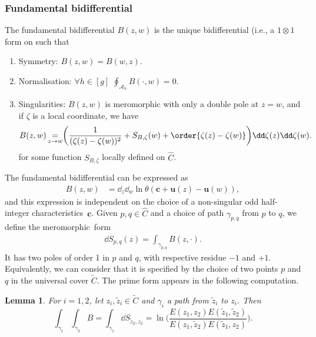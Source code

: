 \documentclass[10pt,a4paper]{amsart}
\numberwithin{equation}{section}
\newtheorem{Lemma}[Theorem]{Lemma}
\newcommand{\A}{\mathcal{A}}
\begin{document}
\subsubsection{Fundamental bidifferential}
\begin{Definition}
 The fundamental bidifferential $B(z, w)$ is the unique bidifferential \big(i.e., a $1 \otimes 1$ form on  such that
 \begin{enumerate}\itemsep=0pt
 \item Symmetry: $B(z, w) = B(w, z)$.
 \item Normalisation: $\forall h \in [g]$ $\oint_{\A_{h}}B(\cdot, w) = 0$.
 \item Singularities: $B(z, w)$ is meromorphic with only a double pole at $z = w$, and if $\zeta$ is a local coordinate, we have
\[
 B(z, w) \mathop{=}_{z \rightarrow w} \biggl(\frac{1}{(\zeta(z) - \zeta(w))^{2}} + S_{B,\zeta}(w) + \order{\zeta(z) - \zeta(w)}\biggr)\dd \zeta(z) \dd \zeta(w).
\]
for some function $S_{B,\zeta}$ locally defined on $\widehat{C}$.
 \end{enumerate}
\end{Definition}

The fundamental bidifferential can be expressed as
\begin{equation*}
 \begin{split}
 B(z,w) &= \dd_{z}\dd_{w}\ln \theta(\bm{c} + \bm{u}(z) - \bm{u}(w)),
 \end{split}
\end{equation*}
and this expression is independent on the choice of a non-singular odd half-integer characteristics~$\bm{c}$. Given $p,q \in \widehat{C}$ and a choice of path $\gamma_{p,q}$ from $p$ to $q$, we define the meromorphic~form
\begin{equation*}
 \begin{split}
 \dd S_{p,q}(z) = \int_{\gamma_{p,q}} B(z, \cdot).
 \end{split}
\end{equation*}
It has two poles of order 1 in $p$ and $q$, with respective residue
$-1$ and $+1$. Equivalently, we can consider that it is specified by the choice of two points $p$ and $q$ in the universal cover $\widetilde{C}$. The prime form appears in the following computation.
\begin{Lemma}
\label{IntB} For $i = 1,2$, let $z_i,\tilde{z}_i \in \widetilde{C}$ and $\gamma_i$ a path from $\tilde{z}_i$ to $z_i$. Then
\[
\int_{\gamma_1} \int_{\gamma_2} B = \int_{\gamma_1} \dd S_{\tilde{z}_2,z_2} = \ln\biggl(\frac{E(z_1,z_2)E(\tilde{z}_1,\tilde{z}_2)}{E(z_1,\tilde{z}_2)E(\tilde{z}_1,z_2)}\biggr).
\]
\end{Lemma}
\end{document}
